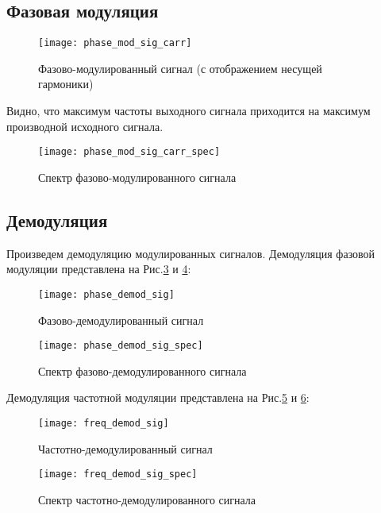 \subsection{Фазовая модуляция}

\begin{figure}[H]
	\begin{center}
		\texttt{[image: phase\_mod\_sig\_carr]}
		\caption{Фазово-модулированный сигнал (с отображением несущей гармоники)} 
		\label{pic:phase_mod_sig_carr} %
	\end{center}
\end{figure}
Видно, что максимум частоты выходного сигнала приходится на максимум производной исходного сигнала.
\begin{figure}[H]
	\begin{center}
		\texttt{[image: phase\_mod\_sig\_carr\_spec]}
		\caption{Спектр фазово-модулированного сигнала} 
		\label{pic:phase_mod_sig_carr_spec} %
	\end{center}
\end{figure}

\subsection{Демодуляция}
Произведем демодуляцию модулированных сигналов.
Демодуляция фазовой модуляции представлена на Рис.\ref{pic:phase_demod_sig} и \ref{pic:phase_demod_sig_spec}:
\begin{figure}[H]
	\begin{center}
		\texttt{[image: phase\_demod\_sig]}
		\caption{Фазово-демодулированный сигнал} 
		\label{pic:phase_demod_sig} %
	\end{center}
\end{figure}
\begin{figure}[H]
	\begin{center}
		\texttt{[image: phase\_demod\_sig\_spec]}
		\caption{Спектр фазово-демодулированного сигнала} 
		\label{pic:phase_demod_sig_spec} %
	\end{center}
\end{figure}
Демодуляция частотной модуляции представлена на Рис.\ref{pic:freq_demod_sig} и \ref{pic:freq_demod_sig_spec}:
\begin{figure}[H]
	\begin{center}
		\texttt{[image: freq\_demod\_sig]}
		\caption{Частотно-демодулированный сигнал} 
		\label{pic:freq_demod_sig} %
	\end{center}
\end{figure}
\begin{figure}[H]
	\begin{center}
		\texttt{[image: freq\_demod\_sig\_spec]}
		\caption{Спектр частотно-демодулированного сигнала} 
		\label{pic:freq_demod_sig_spec} %
	\end{center}
\end{figure}

